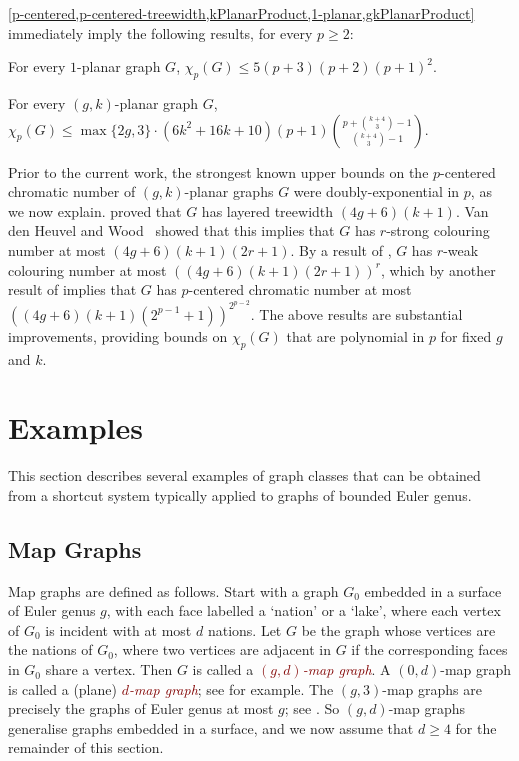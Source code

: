 \documentclass{patmorin}
\newcommand{\defin}[1]{\textcolor{Maroon}{\emph{#1}}}
\newcommand{\note}[2]{\noindent{\color{red}[#1:~#2]}}
\renewcommand{\ge}{\geqslant}
\renewcommand{\le}{\leqslant}
\renewcommand{\geq}{\geqslant}
\begin{document}
\cref{p-centered,p-centered-treewidth,kPlanarProduct,1-planar,gkPlanarProduct} immediately imply the following results, for every $p\ge 2$:

\begin{cor}\quad
\begin{compactitem}
\item For every $1$-planar graph $G$,\; $ \chi_p(G)\le 5 (p+3)(p+2)(p+1)^2$.
\item For every $(g,k)$-planar graph $G$,\;
$\displaystyle \chi_p(G) \le \max\{2g,3\}\cdot(6k^2+16k+10) (p+1) \binom{p+\binom{k+4}{3}-1}{\binom{k+4}{3}-1}$.
\note{DW}{I have changed $\binom{k+5}{4}$ to $\binom{k+4}{3}$, okay?}
 \end{compactitem}
\end{cor}

Prior to the current work, the strongest known upper bounds on the $p$-centered chromatic number of $(g,k)$-planar graphs $G$ were doubly-exponential in $p$, as we now explain. \citet{dujmovic.eppstein.ea:structure} proved that $G$ has layered treewidth $(4g+6)(k+1)$.
Van den Heuvel and Wood~\citep{vdHW17} showed that this implies that $G$  has $r$-strong colouring number at most $(4g + 6)(k + 1)(2r + 1)$. By a result of \citet{zhu:colouring}, $G$ has $r$-weak colouring number at most $( (4g + 6)(k + 1)(2r + 1) )^r$, which by another result of  \citet{zhu:colouring} implies that $G$ has  $p$-centered chromatic number at most $( (4g+6)(k+1)(2^{p-1} + 1) )^{2^{p-2}}$. The above results are substantial improvements, providing bounds on $\chi_p(G)$ that are polynomial in $p$ for fixed $g$ and $k$.


\section{Examples}
\label{Examples}

This section describes several examples of graph classes that can be obtained from a shortcut system typically applied to graphs of bounded Euler genus.


\subsection{Map Graphs}

Map graphs are defined as follows. Start with a graph $G_0$ embedded in a surface of Euler genus $g$, with each face labelled a `nation' or a `lake', where each vertex of $G_0$ is incident with at most $d$ nations. Let $G$ be the graph whose vertices are the nations of $G_0$, where two vertices are adjacent in $G$ if the corresponding faces in $G_0$ share a vertex. Then $G$ is called a \defin{$(g,d)$-map graph}.  A $(0,d)$-map graph is called a (plane) \defin{$d$-map graph}; see \citep{FLS-SODA12,CGP02} for example.
The $(g,3)$-map graphs are precisely the graphs of Euler genus at most $g$; see \citep{dujmovic.eppstein.ea:structure}. So $(g,d)$-map graphs generalise graphs embedded in a surface, and we now assume that $d\geq 4$ for the remainder of this section.
\end{document}
